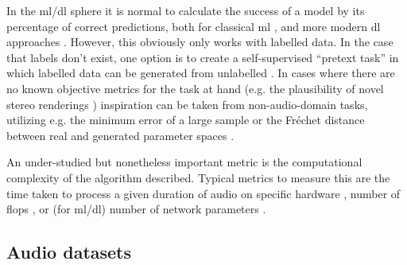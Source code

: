\documentclass[referee,pdflatex,sn-mathphys-num]{sn-jnl}%
\newcommand{\q}[1]{\enquote{#1}}
\begin{document}
In the \gls{ml}/\gls{dl} sphere it is normal to calculate the success of a model by its percentage of correct predictions, both for classical \gls{ml} \cite{tzanetakisStereoPanningFeatures2007,tardieuProductionEffectAudio2011,chenMixedStereoAudio2014}, and more modern \gls{dl} approaches \cite{zielinskiAutomaticDiscriminationFront2022,zielinskiImprovingClassificationBasic2020,zielinskiSpatialAudioScene2022}. However, this obviously only works with labelled data. In the case that labels don't exist, one option is to create a self-supervised \q{pretext task} in which labelled data can be generated from unlabelled \cite{yangSelfSupervisedLearningSpatial2024,satoSelfSupervisedLearningAudioVisual2022,mourgelaExploringTrendsAudio2024,liCrossmodalGenerativeModel2024}. In cases where there are no known objective metrics for the task at hand (e.g. the plausibility of novel stereo renderings \cite{serraMonotostereoParametricStereo2023}) inspiration can be taken from non-audio-domain tasks, utilizing e.g. the minimum error of a large sample or the Fréchet distance between real and generated parameter spaces \cite{tomczakDeepGenerativeModeling2024}.

An under-studied but nonetheless important metric is the computational complexity of the algorithm described. Typical metrics to measure this are the time taken to process a given duration of audio on specific hardware \cite{gorlowInformedSeparationSpatial2013}, number of \glspl{flop} \cite{zhuEndtoEndPairedAmbisonicBinaural2024}, or (for \gls{ml}/\gls{dl}) number of network parameters \cite{zhuEndtoEndPairedAmbisonicBinaural2024}.


\subsection{Audio datasets}
\label{sec:audio_datasets}
\end{document}

